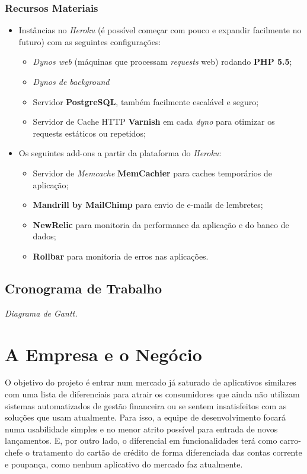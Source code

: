 \documentclass[a4paper]{abnt}
\begin{document}
\subsection*{Recursos Materiais}
\begin{itemize}
	\item Instâncias no \emph{Heroku} (é possível começar com pouco e expandir facilmente no futuro\cite{heroku}) com as seguintes configurações:
	\begin{itemize}
		\item \emph{Dynos web} (máquinas que processam \emph{requests} web) rodando \textbf{PHP 5.5};
		\item \emph{Dynos de background} 
		\item Servidor \textbf{PostgreSQL}, também facilmente escalável e seguro\cite{heroku-pgsql};
		\item Servidor de Cache HTTP \textbf{Varnish} em cada \emph{dyno} para otimizar os requests estáticos ou repetidos;
	\end{itemize}
	
	\item Os seguintes add-ons a partir da plataforma do \emph{Heroku}:
	\begin{itemize}
		\item Servidor de \emph{Memcache} \textbf{MemCachier} para caches temporários de aplicação;
		\item \textbf{Mandrill by MailChimp} para envio de e-mails de lembretes;
		\item \textbf{NewRelic} para monitoria da performance da aplicação e do banco de dados;
		\item \textbf{Rollbar} para monitoria de erros nas aplicações.
	\end{itemize}
\end{itemize}

\section{Cronograma de Trabalho}
\emph{Diagrama de Gantt.}

\chapter{A Empresa e o Negócio}
O objetivo do projeto é entrar num mercado já saturado de aplicativos similares com uma lista de diferenciais para atrair os consumidores que ainda não utilizam sistemas automatizados de gestão financeira ou se sentem insatisfeitos com as soluções que usam atualmente. Para isso, a equipe de desenvolvimento focará numa usabilidade simples e no menor atrito possível para entrada de novos lançamentos. E, por outro lado, o diferencial em funcionalidades terá como carro-chefe o tratamento do cartão de crédito de forma diferenciada das contas corrente e poupança, como nenhum aplicativo do mercado faz atualmente.
\end{document}
